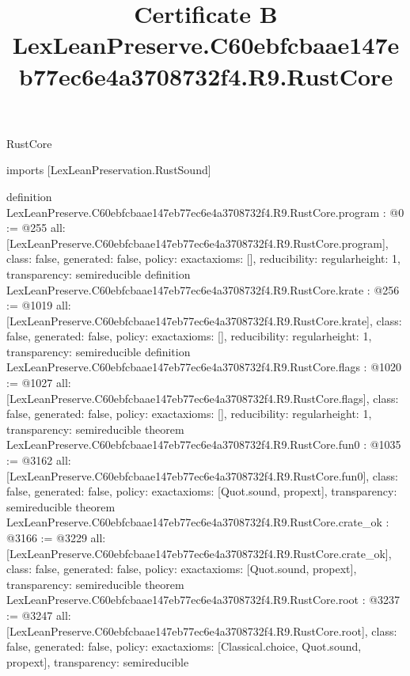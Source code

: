 \begin{lexlean}{RustCore}
\title{Certificate B LexLeanPreserve.C60ebfcbaae147eb77ec6e4a3708732f4.R9.RustCore}
\begin{coremodule}
imports [LexLeanPreservation.RustSound]

definition LexLeanPreserve.C60ebfcbaae147eb77ec6e4a3708732f4.R9.RustCore.program : @0 := @255 {
  all: [LexLeanPreserve.C60ebfcbaae147eb77ec6e4a3708732f4.R9.RustCore.program],
  class: false,
  generated: false,
  policy: exact{axioms: []},
  reducibility: regular{height: 1},
  transparency: semireducible
}
definition LexLeanPreserve.C60ebfcbaae147eb77ec6e4a3708732f4.R9.RustCore.krate : @256 := @1019 {
  all: [LexLeanPreserve.C60ebfcbaae147eb77ec6e4a3708732f4.R9.RustCore.krate],
  class: false,
  generated: false,
  policy: exact{axioms: []},
  reducibility: regular{height: 1},
  transparency: semireducible
}
definition LexLeanPreserve.C60ebfcbaae147eb77ec6e4a3708732f4.R9.RustCore.flags : @1020 := @1027 {
  all: [LexLeanPreserve.C60ebfcbaae147eb77ec6e4a3708732f4.R9.RustCore.flags],
  class: false,
  generated: false,
  policy: exact{axioms: []},
  reducibility: regular{height: 1},
  transparency: semireducible
}
theorem LexLeanPreserve.C60ebfcbaae147eb77ec6e4a3708732f4.R9.RustCore.fun0 : @1035 := @3162 {
  all: [LexLeanPreserve.C60ebfcbaae147eb77ec6e4a3708732f4.R9.RustCore.fun0],
  class: false,
  generated: false,
  policy: exact{axioms: [Quot.sound, propext]},
  transparency: semireducible
}
theorem LexLeanPreserve.C60ebfcbaae147eb77ec6e4a3708732f4.R9.RustCore.crate_ok : @3166 := @3229 {
  all: [LexLeanPreserve.C60ebfcbaae147eb77ec6e4a3708732f4.R9.RustCore.crate_ok],
  class: false,
  generated: false,
  policy: exact{axioms: [Quot.sound, propext]},
  transparency: semireducible
}
theorem LexLeanPreserve.C60ebfcbaae147eb77ec6e4a3708732f4.R9.RustCore.root : @3237 := @3247 {
  all: [LexLeanPreserve.C60ebfcbaae147eb77ec6e4a3708732f4.R9.RustCore.root],
  class: false,
  generated: false,
  policy: exact{axioms: [Classical.choice, Quot.sound, propext]},
  transparency: semireducible
}


\end{coremodule}
\end{lexlean}
